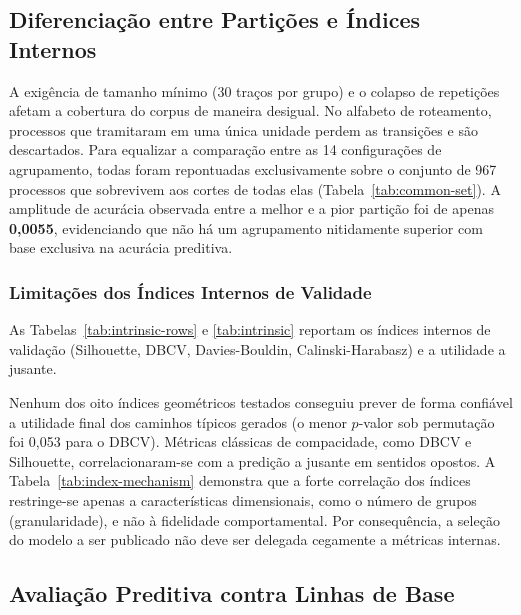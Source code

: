 

\subsection{Diferenciação entre Partições e Índices Internos}\label{sec:res-particoes}

A exigência de tamanho mínimo (30 traços por grupo) e o colapso de repetições afetam a cobertura do corpus de maneira desigual. No alfabeto de roteamento, processos que tramitaram em uma única unidade perdem as transições e são descartados. Para equalizar a comparação entre as 14 configurações de agrupamento, todas foram repontuadas exclusivamente sobre o conjunto de 967 processos que sobrevivem aos cortes de todas elas (Tabela~\ref{tab:common-set}). A amplitude de acurácia observada entre a melhor e a pior partição foi de apenas \textbf{0,0055}, evidenciando que não há um agrupamento nitidamente superior com base exclusiva na acurácia preditiva.



\subsubsection{Limitações dos Índices Internos de Validade}\label{sec:res-indices}

As Tabelas~\ref{tab:intrinsic-rows} e \ref{tab:intrinsic} reportam os índices internos de validação (Silhouette, DBCV, Davies-Bouldin, Calinski-Harabasz) e a utilidade a jusante. 




Nenhum dos oito índices geométricos testados conseguiu prever de forma confiável a utilidade final dos caminhos típicos gerados (o menor $p$-valor sob permutação foi 0,053 para o DBCV). Métricas clássicas de compacidade, como DBCV e Silhouette, correlacionaram-se com a predição a jusante em sentidos opostos. A Tabela~\ref{tab:index-mechanism} demonstra que a forte correlação dos índices restringe-se apenas a características dimensionais, como o número de grupos (granularidade), e não à fidelidade comportamental. Por consequência, a seleção do modelo a ser publicado não deve ser delegada cegamente a métricas internas.



\subsection{Avaliação Preditiva contra Linhas de Base}\label{sec:res-caminhos}


